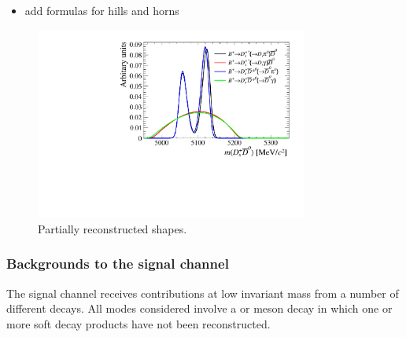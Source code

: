{\color{Red}
\begin{itemize}
\item add formulas for hills and horns
\end{itemize}
}



\begin{figure}[!h]
    \centering
    \includegraphics[width=0.80\textwidth]{figs/B2DsPhi/DsD0_part_reco_Shapes.pdf}
    \caption{Partially reconstructed \Dsp\Dzb shapes.}
    \label{fig:B2DsPhi_DsD0_partreco}   
\end{figure}





\subsubsection{Backgrounds to the signal channel}

The signal channel receives contributions at low invariant mass from a number of different decays. 
All modes considered involve a \Bs or \Bz meson decay in which one or more soft decay products have not been reconstructed.

